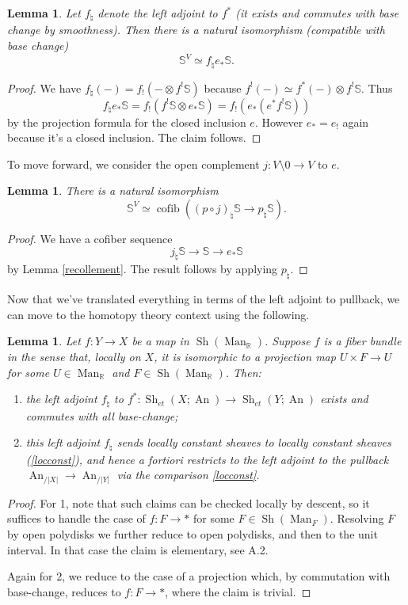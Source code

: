 \documentclass[12pt]{article}
\newtheorem{lemma}[theorem]{Lemma}
\newcommand{\on}{\operatorname}
\newcommand{\mbb}{\mathbb}
\begin{document}
\begin{lemma}
Let $f_\natural$ denote the left adjoint to $f^\ast$ (it exists and commutes with base change by smoothness).  Then there is a natural isomorphism (compatible with base change)
$$\mathbb{S}^V \simeq f_\natural e_\ast\mbb{S}.$$
\end{lemma}
\begin{proof}
We have $f_\natural(-) = f_!(-\otimes f^!\mbb{S})$ because $f^!(-)\simeq f^\ast(-)\otimes f^!\mbb{S}$.  Thus
$$f_\natural e_\ast \mbb{S} = f_!(f^!\mbb{S}\otimes  e_\ast \mathbb{S}) = f_!(e_\ast(e^\ast f^!\mbb{S}))$$
by the projection formula for the closed inclusion $e$.  However $e_\ast = e_!$ again because it's a closed inclusion.  The claim follows.
\end{proof}

To move forward, we consider the open complement $j:V\setminus 0 \to V$ to $e$.

\begin{lemma}
There is a natural isomorphism
$$\mbb{S}^V \simeq \on{cofib}((p\circ j)_\natural\mbb{S} \to p_\natural\mbb{S}).$$
\end{lemma}
\begin{proof}
We have a cofiber sequence
$$j_\natural\mathbb{S} \to \mathbb{S} \to e_\ast\mathbb{S}$$
by Lemma \ref{recollement}.  The result follows by applying $p_\natural$.
\end{proof}

Now that we've translated everything in terms of the left adjoint to pullback, we can move to the homotopy theory context using the following.

\begin{lemma}
Let $f:Y \to X$ be a map in $\on{Sh}(\on{Man}_{\mbb{R}})$.  Suppose $f$ is a \emph{fiber bundle} in the sense that, locally on $X$, it is isomorphic to a projection map $U\times F\to U$ for some $U\in\on{Man}_{\mbb{R}}$ and $F\in\on{Sh}(\on{Man}_\mbb{R})$.  Then:
\begin{enumerate}
\item the left adjoint $f_\natural$ to $f^\ast:\on{Sh}_{et}(X;\on{An})\to\on{Sh}_{et}(Y;\on{An})$ exists and commutes with all base-change;
\item this left adjoint $f_\natural$ sends locally constant sheaves to locally constant sheaves (\ref{locconst}), and hence a fortiori restricts to the left adjoint to the pullback $\on{An}_{/|X|}\to\on{An}_{/|Y|}$ via the comparison \ref{locconst}.
\end{enumerate}
\end{lemma}
\begin{proof}
For 1, note that such claims can be checked locally by descent, so it suffices to handle the case of $f:F\to \ast$ for some $F\in\on{Sh}(\on{Man}_F)$.  Resolving $F$ by open polydisks we further reduce to open polydisks, and then to the unit interval.  In that case the claim is elementary, see \cite{LurieHA} A.2.

Again for 2, we reduce to the case of a projection which, by commutation with base-change, reduces to $f:F\to \ast$, where the claim is trivial.
\end{proof}
\end{document}
